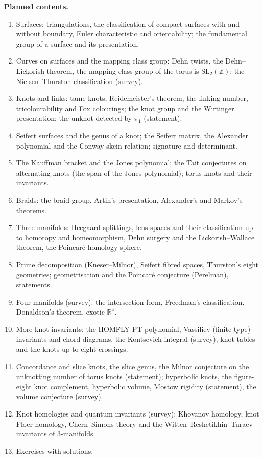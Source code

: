 \noindent\textbf{Planned contents.}
\begin{enumerate}
\item Surfaces: triangulations, the classification of compact surfaces with and without boundary, Euler
characteristic and orientability; the fundamental group of a surface and its presentation.
\item Curves on surfaces and the mapping class group: Dehn twists, the Dehn--Lickorish theorem, the
mapping class group of the torus is $\mathrm{SL}_2(\mathbb{Z})$; the Nielsen--Thurston classification (survey).
\item Knots and links: tame knots, Reidemeister's theorem, the linking number, tricolourability and Fox
colourings; the knot group and the Wirtinger presentation; the unknot detected by $\pi_1$ (statement).
\item Seifert surfaces and the genus of a knot; the Seifert matrix, the Alexander polynomial and the
Conway skein relation; signature and determinant.
\item The Kauffman bracket and the Jones polynomial; the Tait conjectures on alternating knots (the span
of the Jones polynomial); torus knots and their invariants.
\item Braids: the braid group, Artin's presentation, Alexander's and Markov's theorems.
\item Three-manifolds: Heegaard splittings, lens spaces and their classification up to homotopy and
homeomorphism, Dehn surgery and the Lickorish--Wallace theorem, the Poincar\'e homology sphere.
\item Prime decomposition (Kneser--Milnor), Seifert fibred spaces, Thurston's eight geometries;
geometrisation and the Poincar\'e conjecture (Perelman), statements.
\item Four-manifolds (survey): the intersection form, Freedman's classification, Donaldson's theorem,
exotic $\mathbb{R}^4$.
\item More knot invariants: the HOMFLY-PT polynomial, Vassiliev (finite type) invariants and chord diagrams, the Kontsevich integral (survey); knot tables and the knots up to eight crossings.
\item Concordance and slice knots, the slice genus, the Milnor conjecture on the unknotting number of torus knots (statement); hyperbolic knots, the figure-eight knot complement, hyperbolic volume,
Mostow rigidity (statement), the volume conjecture (survey).
\item Knot homologies and quantum invariants (survey): Khovanov homology, knot Floer homology, Chern--Simons theory and the Witten--Reshetikhin--Turaev invariants of $3$-manifolds.
\item Exercises with solutions.
\end{enumerate}
